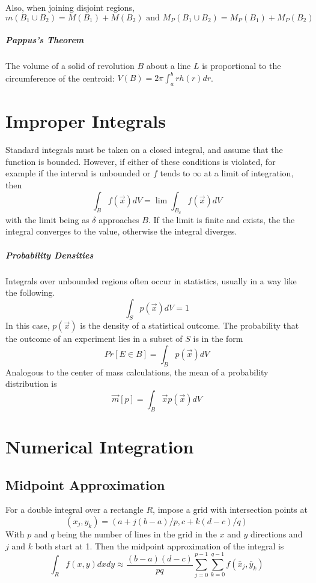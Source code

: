 \documentclass[11pt]{article}
\begin{document}
	Also, when joining disjoint regions, 
	\begin{equation}
		m(B_1 \cup B_2) = M(B_1) + M(B_2) \text{ and } M_P(B_1 \cup B_2) = M_P(B_1) + M_P(B_2)
	\end{equation}
	
	\subparagraph{Pappus's Theorem} The volume of a solid of revolution $B$ about a line $L$ is proportional to the circumference of the centroid: $V(B) = 2\pi \int_a^b rh(r)dr$.
	
\section{Improper Integrals}
	Standard integrals must be taken on a closed integral, and assume that the function is bounded. However, if either of these conditions is violated, for example if the interval is unbounded or $f$ tends to $\infty$ at a limit of integration, then 
	\begin{equation}
		\int_B f(\vec{x})dV = \lim \int_{B_\delta} f(\vec{x})dV
	\end{equation}
	with the limit being as $\delta$ approaches $B$. If the limit is finite and exists, the the integral converges to the value, otherwise the integral diverges.
	
	\subparagraph{Probability Densities} Integrals over unbounded regions often occur in statistics, usually in a way like the following.
	\begin{equation}
		\int_S p(\vec{x})dV = 1
	\end{equation}
	In this case, $p(\vec{x})$ is the density of a statistical outcome. The probability that the outcome of an experiment lies in a subset of $S$ is in the form
	\begin{equation}
		Pr[E \in B] = \int_B p(\vec{x})dV
	\end{equation}
	Analogous to the center of mass calculations, the mean of a probability distribution is
	\begin{equation}
		\vec{m}[p] = \int_B \vec{x}p(\vec{x})dV
	\end{equation}
	
\section{Numerical Integration}
	\subsection{Midpoint Approximation}
		For a double integral over a rectangle $R$, impose a grid with intersection points at
		\begin{equation}
			(x_j, y_k) = (a + j(b - a)/p, c + k(d - c)/q)
		\end{equation}
		With $p$ and $q$ being the number of lines in the grid in the $x$ and $y$ directions and $j$ and $k$ both start at 1. Then the midpoint approximation of the integral is
		\begin{equation}
			\int_R f(x, y)dxdy \approx \frac{(b - a)(d - c)}{pq} \sum_{j=0}^{p-1} \sum_{k=0}^{q-1} f(\bar{x}_j, \bar{y}_k)
		\end{equation}
		
\end{document}
